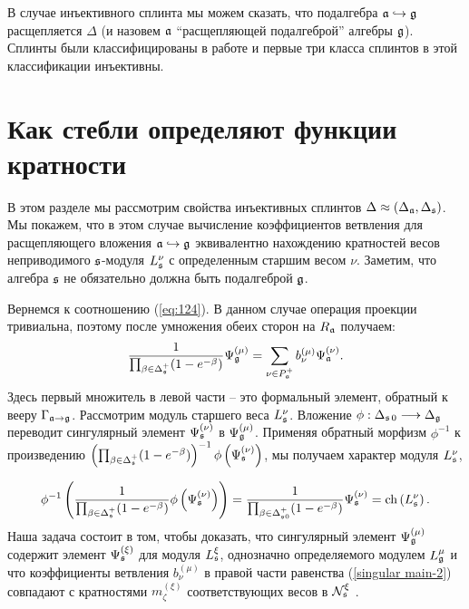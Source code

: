 В случае инъективного сплинта мы можем сказать, что подалгебра $\mathfrak{a}\hookrightarrow \mathfrak{g}$ расщепляется $\Delta$ (и назовем $\mathfrak{a}$ ``расщепляющей подалгеброй'' алгебры $\mathfrak{g}$).  Сплинты были классифицированы в работе \cite{richter2008splints}  и первые три класса сплинтов в этой классификации инъективны. 

\section{Как стебли определяют функции кратности}

\label{sec:stems and multiplicity functions}

В этом разделе мы рассмотрим свойства инъективных сплинтов $\Delta \approx (\Delta _{\mathfrak{a}},\Delta _{\mathfrak{s}})$. Мы покажем, что в этом случае вычисление коэффициентов ветвления для расщепляющего вложения $\mathfrak{a}\hookrightarrow\mathfrak{g}$ эквивалентно нахождению кратностей весов неприводимого $\mathfrak{s}$-модуля $L_{\mathfrak{s}}^{\nu }$ с определенным старшим весом $\nu $. Заметим, что алгебра $\mathfrak{s}$ не обязательно должна быть подалгеброй $\mathfrak{g}$.

Вернемся к соотношению (\ref{eq:124}). В данном случае операция проекции тривиальна, поэтому после умножения обеих сторон на  $R_{\mathfrak{a}}$ получаем:
\begin{equation}
\frac{1}{\prod_{\beta \in \Delta _{\mathfrak{s}}^{+}}(1-e^{-\beta })}\Psi _{\mathfrak{g}}^{\left( \mu \right) }=\sum_{\nu \in P_{\mathfrak{a}}^{+}}b_{\nu}^{(\mu )}\Psi _{\mathfrak{a}}^{\left( \nu \right) }.
\label{singular main-2}
\end{equation}
Здесь первый множитель в левой части -- это формальный элемент, обратный к вееру $\Gamma _{\mathfrak{a}\rightarrow \mathfrak{g}}$. Рассмотрим модуль старшего веса $L_{\mathfrak{s}}^{\nu }$. Вложение $\phi :\Delta _{\mathfrak{s}\,0}\longrightarrow \Delta_{\mathfrak{g}}$ переводит сингулярный элемент  $\Psi _{\mathfrak{s}}^{\left( \nu\right) }$ в $\Psi _{\mathfrak{g}}^{\left( \mu \right) }$. Применяя обратный морфизм $\phi ^{-1}$ к произведению $\left( \prod_{\beta \in \Delta_{\mathfrak{s}}^{+}}(1-e^{-\beta })\right) ^{-1}\phi \left( \Psi _{\mathfrak{s}}^{\left( \nu \right) }\right) $, мы получаем характер модуля $L_{\mathfrak{s}}^{\nu }$,

\begin{equation}
\phi ^{-1}\left( \frac{1}{\prod_{\beta \in \Delta _{\sfr%
}^{+}}(1-e^{-\beta })}\phi \left( \Psi _{\sfr}^{\left( \nu \right)
}\right) \right) =\frac{1}{\prod_{\beta \in \Delta _{\sfr0
}^{+}}(1-e^{-\beta })}\Psi _{\sfr}^{\left( \nu \right) }=\mathrm{ch}%
\left( L_{\sfr}^{\nu }\right) .  \label{inverse for stem}
\end{equation}
Наша задача состоит в том, чтобы доказать, что сингулярный элемент $\Psi _{\mathfrak{g}}^{\left(\mu\right) }$ содержит элемент $\Psi _{\mathfrak{s}}^{\left( \xi \right) }$ для модуля $L_{\mathfrak{s}}^{\xi }$, однозначно определяемого модулем $L_{\mathfrak{g}}^{\mu }$ и что коэффициенты ветвления $b_{\nu }^{(\mu )}$ в правой части равенства (\ref{singular main-2}) совпадают с кратностями $m_{\zeta }^{\left( \xi\right) }$ соответствующих весов в $\mathcal{N}_{\mathfrak{s}}^{\xi }$ .

